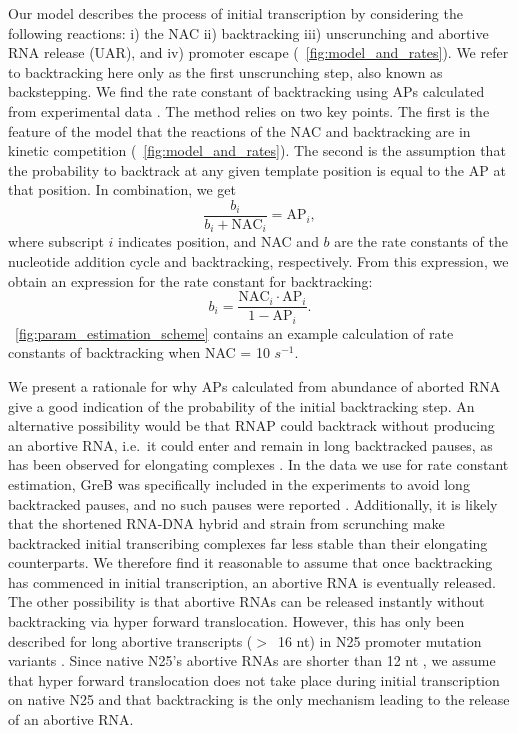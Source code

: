 %
Our model describes the process of initial transcription by considering the
following reactions: i) the NAC ii) backtracking iii) unscrunching and abortive
RNA release (UAR), and iv) promoter escape (\FIG~\ref{fig:model_and_rates}).
We refer to backtracking here only as the first unscrunching step, also known as
backstepping. We find the rate constant of backtracking using APs calculated
from experimental data \cite{hsu_quantitative_1996}. The method relies on two
key points. The first is the feature of the model that the reactions of the
NAC and backtracking are in kinetic competition
(\FIG~\ref{fig:model_and_rates}). The second is the assumption that the
probability to backtrack at any given template position is equal to the AP at
that position. In combination, we get
\begin{equation*}
    \frac{b_i}{b_i + \text{NAC}_i} = \text{AP}_i,
\end{equation*}
where subscript $i$ indicates position, and NAC and $b$ are the rate constants
of the nucleotide addition cycle and backtracking, respectively. From this
expression, we obtain an expression for the rate constant for backtracking:
\begin{equation}
  b_i = \frac{\text{NAC}_i\cdot\text{AP}_i}{1-\text{AP}_i}.
  \label{eq:backtrackingcalc}
\end{equation}
\FIG~\ref{fig:param_estimation_scheme} contains an example calculation of rate
constants of backtracking when NAC = 10 $s^{-1}$.

We present a rationale for why APs calculated from abundance of aborted RNA
give a good indication of the probability of the initial backtracking step.
An alternative possibility would be that RNAP could backtrack without
producing an abortive RNA, i.e.\ it could enter and remain in long backtracked
pauses, as has been observed for elongating complexes
\cite{shaevitz_backtracking_2003}. In the data we use for rate constant
estimation, GreB was specifically included in the experiments to avoid long
backtracked pauses, and no such pauses were reported
\cite{revyakin_abortive_2006}. Additionally, it is likely that the shortened
RNA-DNA hybrid and strain from scrunching make backtracked initial
transcribing complexes far less stable than their elongating counterparts. We
therefore find it reasonable to assume that once backtracking has commenced in
initial transcription, an abortive RNA is eventually released. The other
possibility is that abortive RNAs can be released instantly without
backtracking via hyper forward translocation. However, this has only been
described for long abortive transcripts ($>$~16 nt) in N25 promoter mutation
variants \cite{chander_alternate_2007, chander_mechanisms_2015}. Since native
N25's abortive RNAs are shorter than 12 nt \cite{chander_alternate_2007}, we
assume that hyper forward translocation does not take place during initial
transcription on native N25 and that backtracking is the only mechanism
leading to the release of an abortive RNA.

